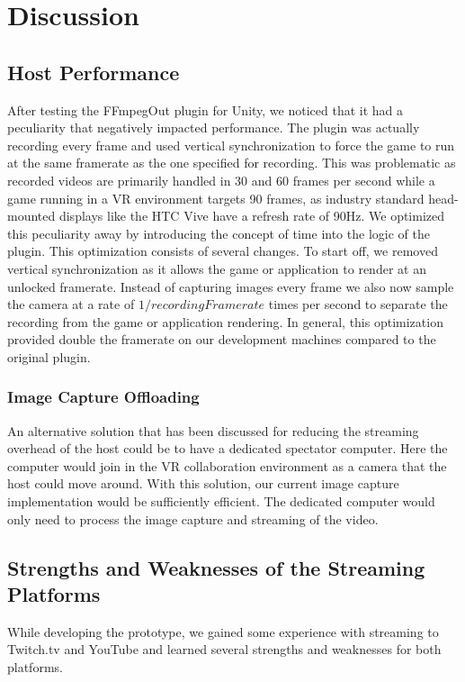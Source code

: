 \section{Discussion}
\subsection{Host Performance}
After testing the FFmpegOut plugin for Unity, we noticed that it had a peculiarity that negatively impacted performance. The plugin was actually recording every frame and used vertical synchronization to force the game to run at the same framerate as the one specified for recording. This was problematic as recorded videos are primarily handled in 30 and 60 frames per second while a game running in a VR environment targets 90 frames, as industry standard head-mounted displays like the HTC Vive have a refresh rate of 90Hz\cite{vive_specs}. We optimized this peculiarity away by introducing the concept of time into the logic of the plugin. This optimization consists of several changes. To start off, we removed vertical synchronization as it allows the game or application to render at an unlocked framerate. Instead of capturing images every frame we also now sample the camera at a rate of $1/recordingFramerate$ times per second to separate the recording from the game or application rendering. In general, this optimization provided double the framerate on our development machines compared to the original plugin. 

\subsubsection{Image Capture Offloading}
An alternative solution that has been discussed for reducing the streaming overhead of the host could be to have a dedicated spectator computer. Here the computer would join in the VR collaboration environment as a camera that the host could move around. With this solution, our current image capture implementation would be sufficiently efficient. The dedicated computer would only need to process the image capture and streaming of the video.

\subsection{Strengths and Weaknesses of the Streaming Platforms}
While developing the prototype, we gained some experience with streaming to Twitch.tv and YouTube and learned several strengths and weaknesses for both platforms.

